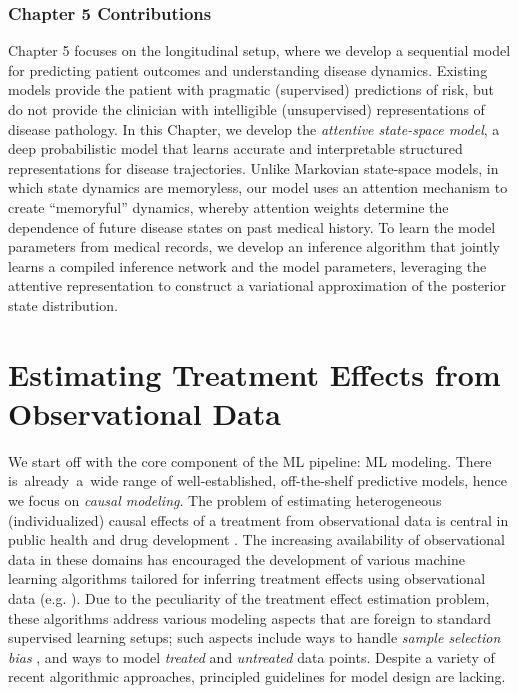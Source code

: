\documentclass [PhD] {uclathes}
\begin{document}
\subsection*{Chapter 5 Contributions}
Chapter 5 focuses on the longitudinal setup, where we develop a sequential model for predicting patient outcomes and understanding disease dynamics. Existing models provide the patient with pragmatic (supervised) predictions of risk, but do not provide the clinician with intelligible (unsupervised) representations of disease pathology. In this Chapter, we develop the \textit{attentive state-space model}, a deep probabilistic model that learns accurate and interpretable structured representations for disease trajectories. Unlike Markovian state-space models, in which state dynamics are memoryless, our model uses an attention mechanism to create ``memoryful'' dynamics, whereby attention weights determine the dependence of future disease states on past medical history. To learn the model parameters from medical records, we develop an inference algorithm that jointly learns a compiled inference network and the model parameters, leveraging the attentive representation to construct a variational approximation of the posterior state distribution. 


\chapter{Estimating Treatment Effects from Observational Data}

We start off with the core component of the ML pipeline: ML modeling. There is~already~a~wide range of well-established, off-the-shelf predictive models, hence we focus on \textit{causal modeling}. The problem of estimating heterogeneous (individualized) causal effects of a treatment from observational data is central in public health and drug development \cite{foster2011subgroup}. The increasing availability of observational data in these domains has encouraged the development of various machine learning algorithms tailored for inferring treatment effects using observational data (e.g. \cite{li2017matching,wager2017estimation,shalit2016estimating,alaa2017bayesian}). Due to the peculiarity of the treatment effect estimation problem, these algorithms address various modeling aspects that are foreign to standard supervised learning setups; such aspects include ways to handle \textit{sample selection bias} \cite{heckman1977sample}, and ways to model \textit{treated} and \textit{untreated} data points. Despite a variety of recent algorithmic approaches, principled guidelines for model design are lacking. 
\end{document}

